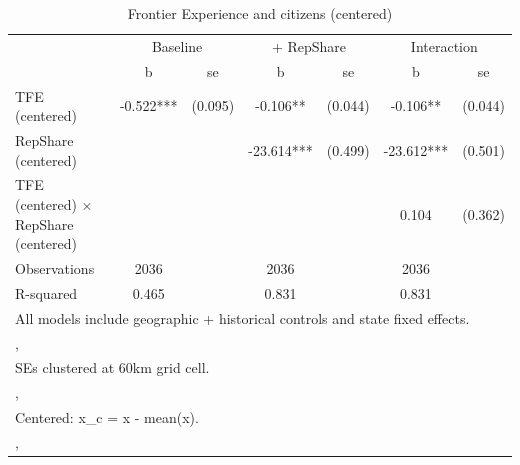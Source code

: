 \begin{table}[htbp]\centering
\def\sym#1{\ifmmode^{#1}\else\(^{#1}\)\fi}
\caption{Frontier Experience and citizens (centered)}
\begin{tabular}{l*{3}{cc}}
\toprule
                &\multicolumn{2}{c}{Baseline}&\multicolumn{2}{c}{ + RepShare}&\multicolumn{2}{c}{Interaction}\\
                &        b   &       se&        b   &       se&        b   &       se\\
\midrule
TFE (centered)  &   -0.522***&  (0.095)&   -0.106** &  (0.044)&   -0.106** &  (0.044)\\
RepShare (centered)&            &         &  -23.614***&  (0.499)&  -23.612***&  (0.501)\\
TFE (centered) $\times$ RepShare (centered)&            &         &            &         &    0.104   &  (0.362)\\
\midrule
Observations    &     2036   &         &     2036   &         &     2036   &         \\
R-squared       &    0.465   &         &    0.831   &         &    0.831   &         \\
\bottomrule
\multicolumn{7}{l}{\footnotesize All models include geographic + historical controls and state fixed effects.}\\
\multicolumn{7}{l}{\footnotesize ,}\\
\multicolumn{7}{l}{\footnotesize SEs clustered at 60km grid cell.}\\
\multicolumn{7}{l}{\footnotesize ,}\\
\multicolumn{7}{l}{\footnotesize Centered: x\_c = x - mean(x).}\\
\multicolumn{7}{l}{\footnotesize ,}\\
\end{tabular}
\end{table}
